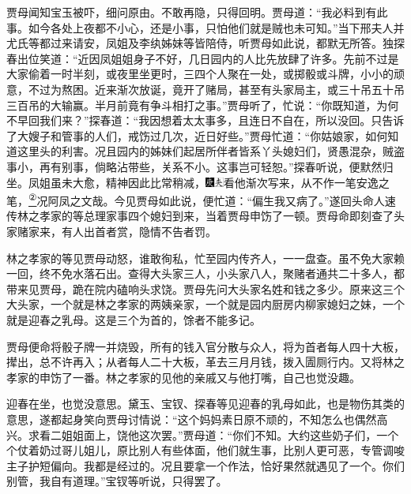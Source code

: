 贾母闻知宝玉被吓，细问原由。不敢再隐，只得回明。贾母道：``我必料到有此事。如今各处上夜都不小心，还是小事，只怕他们就是贼也未可知。''当下邢夫人并尤氏等都过来请安，凤姐及李纨姊妹等皆陪侍，听贾母如此说，都默无所答。独探春出位笑道：``近因凤姐姐身子不好，几日园内的人比先放肆了许多。先前不过是大家偷着一时半刻，或夜里坐更时，三四个人聚在一处，或掷骰或斗牌，小小的顽意，不过为熬困。近来渐次放诞，竟开了赌局，甚至有头家局主，或三十吊五十吊三百吊的大输赢。半月前竟有争斗相打之事。''贾母听了，忙说：``你既知道，为何不早回我们来？''探春道：``我因想着太太事多，且连日不自在，所以没回。只告诉了大嫂子和管事的人们，戒饬过几次，近日好些。''贾母忙道：``你姑娘家，如何知道这里头的利害。况且园内的姊妹们起居所伴者皆系丫头媳妇们，贤愚混杂，贼盗事小，再有别事，倘略沾带些，关系不小。这事岂可轻恕。''探春听说，便默然归坐。凤姐虽未大愈，精神因此比常稍减，{\includegraphics[width=3mm]{../Images/00004}\includegraphics[width=3mm]{../Images/00012}\footnotesize \kaishu 看他渐次写来，从不作一笔安逸之笔，}\href{../Text/part0077_split_000.html\#lnkback_2_a}{\textsuperscript{②}}{况阿凤之文哉。}今见贾母如此说，便忙道：``偏生我又病了。''遂回头命人速传林之孝家的等总理家事四个媳妇到来，当着贾母申饬了一顿。贾母命即刻查了头家赌家来，有人出首者赏，隐情不告者罚。

林之孝家的等见贾母动怒，谁敢徇私，忙至园内传齐人，一一盘查。虽不免大家赖一回，终不免水落石出。查得大头家三人，小头家八人，聚赌者通共二十多人，都带来见贾母，跪在院内磕响头求饶。贾母先问大头家名姓和钱之多少。原来这三个大头家，一个就是林之孝家的两姨亲家，一个就是园内厨房内柳家媳妇之妹，一个就是迎春之乳母。这是三个为首的，馀者不能多记。

贾母便命将骰子牌一并烧毁，所有的钱入官分散与众人，将为首者每人四十大板，撵出，总不许再入；从者每人二十大板，革去三月月钱，拨入圊厕行内。又将林之孝家的申饬了一番。林之孝家的见他的亲戚又与他打嘴，自己也觉没趣。

迎春在坐，也觉没意思。黛玉、宝钗、探春等见迎春的乳母如此，也是物伤其类的意思，遂都起身笑向贾母讨情说：``这个妈妈素日原不顽的，不知怎么也偶然高兴。求看二姐姐面上，饶他这次罢。''贾母道：``你们不知。大约这些奶子们，一个个仗着奶过哥儿姐儿，原比别人有些体面，他们就生事，比别人更可恶，专管调唆主子护短偏向。我都是经过的。况且要拿一个作法，恰好果然就遇见了一个。你们别管，我自有道理。''宝钗等听说，只得罢了。

